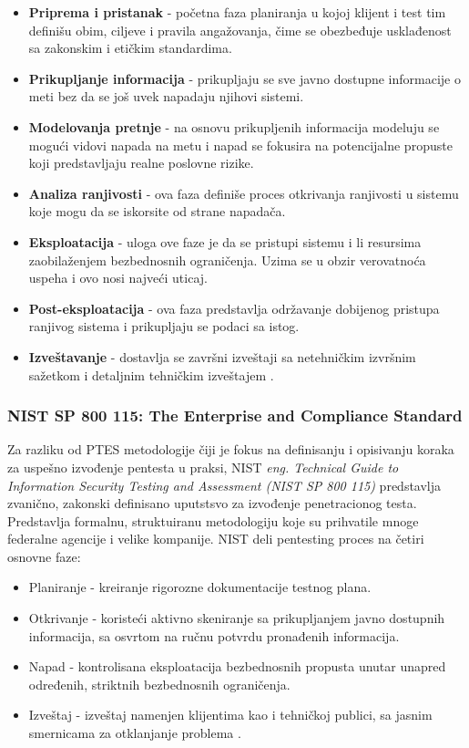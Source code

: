 \documentclass[a4paper,12pt]{article}
\begin{document}
\begin{itemize}
    

    \item \textbf{Priprema i pristanak} - početna faza planiranja u kojoj klijent i test tim definišu obim, ciljeve i pravila angažovanja, čime se obezbeđuje usklađenost sa zakonskim i etičkim standardima.

    \item \textbf{Prikupljanje informacija} - prikupljaju se sve javno dostupne informacije o meti bez da se još uvek napadaju njihovi sistemi. 

    \item \textbf{Modelovanja pretnje} - na osnovu prikupljenih informacija modeluju se mogući vidovi napada na metu i napad se fokusira na potencijalne propuste koji predstavljaju realne poslovne rizike.
    \item \textbf{Analiza ranjivosti} - ova faza definiše proces otkrivanja ranjivosti u sistemu koje mogu da se iskorsite od strane napadača. 

    \item \textbf{Eksploatacija} - uloga ove faze je da se pristupi sistemu i li resursima zaobilaženjem bezbednosnih ograničenja. Uzima se u obzir verovatnoća uspeha i ovo nosi najveći uticaj. 
    \item \textbf{Post-eksploatacija} - ova faza predstavlja održavanje dobijenog pristupa ranjivog sistema i prikupljaju se podaci sa istog. 
    \item \textbf{Izveštavanje} - dostavlja se završni izveštaji sa netehničkim izvršnim sažetkom i detaljnim tehničkim izveštajem \cite{pentest-standard} \cite{pentest-standard-gfg}. \\
\end{itemize}
\subsubsection{NIST SP 800 115: The Enterprise and Compliance Standard}
Za razliku od PTES metodologije čiji je fokus na definisanju i opisivanju koraka za uspešno izvođenje pentesta u praksi, NIST \textit{eng. Technical Guide to Information Security Testing and Assessment (NIST SP 800 115) } \cite{nist1} predstavlja zvanično, zakonski definisano uputstsvo za izvođenje penetracionog testa. Predstavlja formalnu, struktuiranu metodologiju koje su prihvatile mnoge federalne agencije i velike kompanije. 
NIST deli pentesting proces na četiri osnovne faze: 
\begin{itemize}
  \item Planiranje - kreiranje rigorozne dokumentacije testnog plana.
  \item Otkrivanje - koristeći aktivno skeniranje sa prikupljanjem javno dostupnih informacija, sa osvrtom na ručnu potvrdu pronađenih informacija.
  \item Napad - kontrolisana eksploatacija bezbednosnih propusta unutar unapred određenih, striktnih bezbednosnih ograničenja.
  \item Izveštaj - izveštaj namenjen klijentima kao i tehničkoj publici, sa jasnim smernicama za otklanjanje problema \cite{nist}.
\end{itemize}
\end{document}
